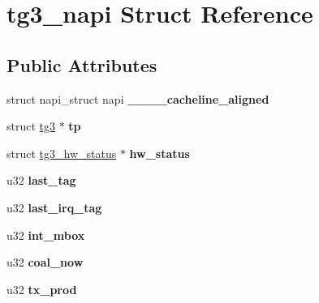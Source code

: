 \hypertarget{structtg3__napi}{
\section{tg3\_\-napi Struct Reference}
\label{structtg3__napi}
}
\subsection*{Public Attributes}
\begin{DoxyCompactItemize}
\item 
\hypertarget{structtg3__napi_a95a5169af18930896265ed12a011bcdf}{
struct napi\_\-struct napi {\bfseries \_\-\_\-\_\-\_\-cacheline\_\-aligned}}
\label{structtg3__napi_a95a5169af18930896265ed12a011bcdf}

\item 
\hypertarget{structtg3__napi_a67bb15b12e9d223d4ee1f4ea6a8a788c}{
struct \hyperlink{structtg3}{tg3} $\ast$ {\bfseries tp}}
\label{structtg3__napi_a67bb15b12e9d223d4ee1f4ea6a8a788c}

\item 
\hypertarget{structtg3__napi_a019739fe1ae51afca1afb4386c84a4c9}{
struct \hyperlink{structtg3__hw__status}{tg3\_\-hw\_\-status} $\ast$ {\bfseries hw\_\-status}}
\label{structtg3__napi_a019739fe1ae51afca1afb4386c84a4c9}

\item 
\hypertarget{structtg3__napi_ab17e754686e4e4bf8fea7f49a0cfcb93}{
u32 {\bfseries last\_\-tag}}
\label{structtg3__napi_ab17e754686e4e4bf8fea7f49a0cfcb93}

\item 
\hypertarget{structtg3__napi_a72b06464e2bdad542a6b7b02be8149c7}{
u32 {\bfseries last\_\-irq\_\-tag}}
\label{structtg3__napi_a72b06464e2bdad542a6b7b02be8149c7}

\item 
\hypertarget{structtg3__napi_a50d5303b481440c5c919a0ef9ef8ab0b}{
u32 {\bfseries int\_\-mbox}}
\label{structtg3__napi_a50d5303b481440c5c919a0ef9ef8ab0b}

\item 
\hypertarget{structtg3__napi_ab7c7be68cee6272ca244dcb023d57a21}{
u32 {\bfseries coal\_\-now}}
\label{structtg3__napi_ab7c7be68cee6272ca244dcb023d57a21}

\item 
\hypertarget{structtg3__napi_a16bc448fedc3b0a72e1b3d3f39b2cc5d}{
u32 {\bfseries tx\_\-prod}}
\label{structtg3__napi_a16bc448fedc3b0a72e1b3d3f39b2cc5d}


\end{DoxyCompactItemize}
